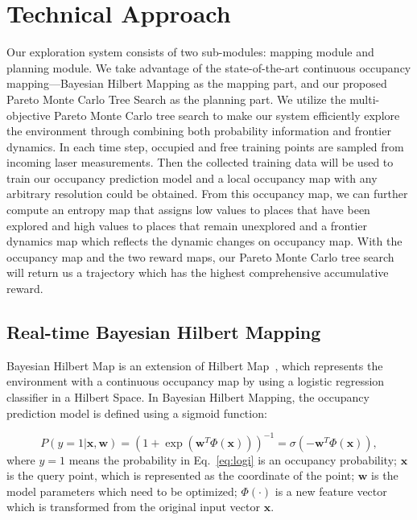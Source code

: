 \section{Technical Approach}\label{sec:2}
\lipsum[1]

Our exploration system consists of two sub-modules: mapping module and planning module. We take advantage of the state-of-the-art continuous occupancy mapping---Bayesian Hilbert Mapping\cite{senanayake2017bayesian} as the mapping part, and our proposed Pareto Monte Carlo Tree Search\cite{chen2019pareto} as the planning part. We utilize the multi-objective Pareto Monte Carlo tree search to make our system efficiently explore the environment through combining both probability information and frontier dynamics. In each time step, occupied and free training points are sampled from incoming laser measurements. Then the collected training data will be used to train our occupancy prediction model and a local occupancy map with any arbitrary resolution could be obtained. From this occupancy map, we can further compute an entropy map that assigns low values to places that have been explored and high values to places that remain unexplored and a frontier dynamics map which reflects the dynamic changes on occupancy map. With the occupancy map and the two reward maps, our Pareto Monte Carlo tree search will return us a trajectory which has the highest comprehensive accumulative reward.

\subsection{Real-time Bayesian Hilbert Mapping}\label{subsec:2.1}


Bayesian Hilbert Map is an extension of Hilbert Map~\cite{ramos2016hilbert}, which represents the environment with a continuous occupancy map by using a logistic regression classifier in a Hilbert Space. In Bayesian Hilbert Mapping, the occupancy prediction model is defined using a sigmoid function:

\begin{equation}
    \label{eq:logi}
    P(y=1|\mathbf{x}, \mathbf{w}) = \left ( 1 + \exp(\mathbf{w}^T\Phi(\mathbf{x})) \right )^{-1} = \sigma(-\mathbf{w}^T\Phi(\mathbf{x})),
\end{equation}
where $y=1$ means the probability in Eq.~\ref{eq:logi} is an occupancy probability; $\mathbf{x}$ is the query point, which is represented as the coordinate of the point; $\mathbf{w}$ is the model parameters which need to be optimized; $\Phi(\cdot)$ is a new feature vector which is transformed from the original input vector $\mathbf{x}$.

